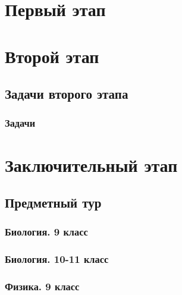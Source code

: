 \documentclass[a4paper,12pt,oneside]{book}
\begin{document}

\setcounter{tocdepth}{1}

\setcounter{page}{3}

\tableofcontents



\part{Первый этап}





\part{Второй этап}
\clearpage
\chapter{Задачи второго этапа}
\section{Задачи}


 
\part{Заключительный этап}

\clearpage
\chapter{Предметный тур}

\section{Биология. 9 класс}


\section{Биология. 10-11 класс}


\section{Физика. 9 класс}

\end{document}
